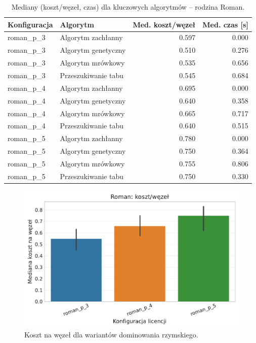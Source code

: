 \begin{table}[H]
  \centering
  \caption{Mediany (koszt/węzeł, czas) dla kluczowych algorytmów -- rodzina Roman.}
  \label{tab:ext-roman-static}
  \begin{tabular}{llrr}
    \toprule
    \textbf{Konfiguracja} & \textbf{Algorytm}   & \textbf{Med. koszt/węzeł} & \textbf{Med. czas [s]} \\
    \midrule
    roman\_p\_3           & Algorytm zachłanny  & 0.597                     & 0.000                  \\
    roman\_p\_3           & Algorytm genetyczny & 0.510                     & 0.276                  \\
    roman\_p\_3           & Algorytm mrówkowy   & 0.535                     & 0.656                  \\
    roman\_p\_3           & Przeszukiwanie tabu & 0.545                     & 0.684                  \\
    roman\_p\_4           & Algorytm zachłanny  & 0.695                     & 0.000                  \\
    roman\_p\_4           & Algorytm genetyczny & 0.640                     & 0.358                  \\
    roman\_p\_4           & Algorytm mrówkowy   & 0.665                     & 0.717                  \\
    roman\_p\_4           & Przeszukiwanie tabu & 0.640                     & 0.515                  \\
    roman\_p\_5           & Algorytm zachłanny  & 0.780                     & 0.000                  \\
    roman\_p\_5           & Algorytm genetyczny & 0.750                     & 0.364                  \\
    roman\_p\_5           & Algorytm mrówkowy   & 0.755                     & 0.806                  \\
    roman\_p\_5           & Przeszukiwanie tabu & 0.750                     & 0.330                  \\
  \end{tabular}
\end{table}

\begin{figure}[H]
  \centering
  \includegraphics[width=0.6\linewidth]{assets/figures/extensions/static/roman_cost_per_node_comparison.pdf}
  \caption{Koszt na węzeł dla wariantów dominowania rzymskiego.}
  \label{fig:ext-roman-cost}
\end{figure}


